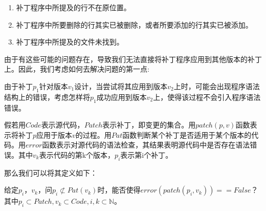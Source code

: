 \begin{enumerate}
	\item 补丁程序中所提及的行不在原位置。
	\item 补丁程序中所要删除的行其实已被删除，或者所要添加的行其实已被添加。
	\item 补丁程序中所提及的文件未找到。
\end{enumerate}

由于有这些可能的问题存在，导致我们无法直接将补丁程序应用到其他版本的补丁上。因此，我们考虑如何去解决问题的第一点:

由于补丁$p_1$针对版本$v_{1}$设计，当尝试将其应用到版本$v_{2}$上时，可能会出现程序语法结构上的错误，考虑怎样将$p_1$成功应用到版本$v_{2}$上，使得该过程不会引入程序语法错误。

	

	假若用$Code$表示源代码，$Patch$表示补丁，即变更的集合。用$patch(p,v)$函数表示将补丁$p$应用于版本$v$的过程。用$Pat$函数判断某个补丁是否适用于某个版本的代码。用$error$函数表示对源代码的语法检查，其结果表明源代码中是否存在语法错误。其中$v_k$表示代码的第k个版本，$p_i$表示第i个补丁。
	
	那么我们可以将其定义如下：
\begin{definition}
	给定$p_i$，$v_k$，问$p_i \not \subset Pat(v_k)$时，能否使得$error(patch(p_i,v_k)) == False$？其中$p_i \subset Patch,v_k \subset Code,i,k \subset \mathbb{N}$。
\end{definition}
	
	





